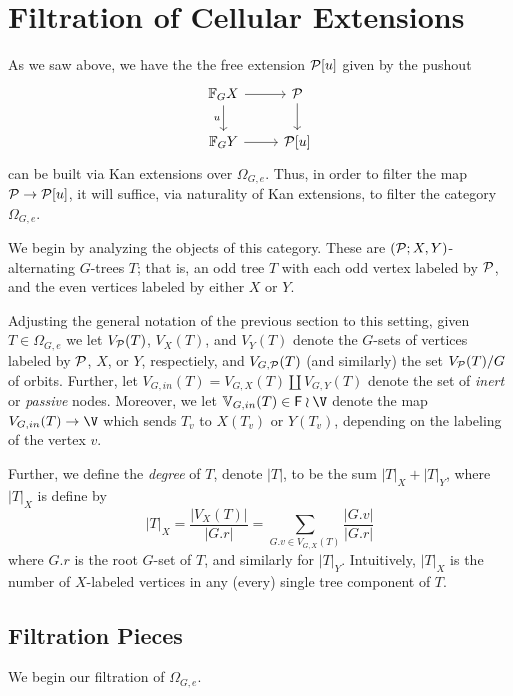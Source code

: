\documentclass[a4paper,10pt]{article}%
\begin{document}
\section{Filtration of Cellular Extensions}

As we saw above, we have the the free extension $\P[u]$ given by the pushout
\[
\begin{tikzcd}
  \mathbb F_G X \arrow[d, "u"'] \arrow[r] & \P \arrow[d]\\
  \mathbb F_G Y \arrow[r] & \P[u]
\end{tikzcd}
\]
can be built via Kan extensions over $\Omega_{G,e}$. Thus, in order to filter the map $\P \to \P[u]$, it will suffice, via naturality of Kan extensions, to filter the category $\Omega_{G,e}$.

We begin by analyzing the objects of this category. These are $(\P; X,Y)$-alternating $G$-trees $T$; that is, an odd tree $T$ with each odd vertex labeled by $\P$, and the even vertices labeled by either $X$ or $Y$.

Adjusting the general notation of the previous section to this setting, given $T\in \Omega_{G,e}$ we let $V_{\P}(T)$, $V_{X}(T)$, and $V_{Y}(T)$ denote the $G$-sets of vertices labeled by $\P$, $X$, or $Y$, respectiely, and $V_{G,\P}(T)$ (and similarly) the set $V_{\P}(T)/G$ of orbits. Further, let $V_{G,in}(T) = V_{G,X}(T) \amalg V_{G,Y}(T)$ denote the set of \textit{inert} or \textit{passive} nodes. Moreover, we let $\mathbb V_{G,in}(T) \in \mathsf F \wr \V$ denote the map $V_{G,in}(T) \to \V$ which sends $T_v$ to $X(T_v)$ or $Y(T_v)$, depending on the labeling of the vertex $v$.

Further, we define the \textit{degree} of $T$, denote $|T|$, to be the sum $|T|_X + |T|_Y$, where $|T|_X$ is define by
\[
|T|_X = \dfrac{|V_X(T)|}{|G.r|} = \sum\limits_{G.v\in V_{G,X}(T)}\dfrac{|G.v|}{|G.r|}
\]
where $G.r$ is the root $G$-set of $T$, and similarly for $|T|_Y$. Intuitively, $|T|_X$ is the number of $X$-labeled vertices in any (every) single tree component of $T$.


\subsection{Filtration Pieces}

We begin our filtration of $\Omega_{G,e}$. 
\end{document}
